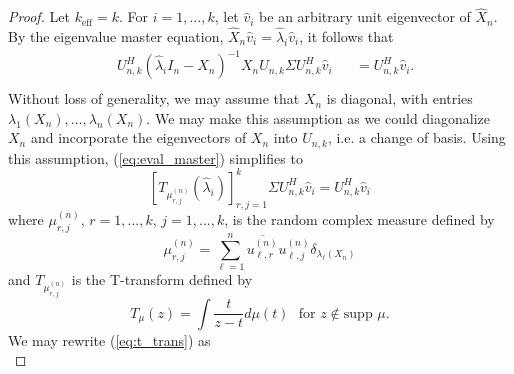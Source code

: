 \begin{proof}
Let $k_\text{eff}=k$. For $i=1,\dots, k$, let $\widehat{v}_i$ be an arbitrary unit eigenvector of $\widehat{X}_n$. By the eigenvalue master equation, $\widehat{X}_n\widehat{v}_i=\widehat{\lambda}_i\widehat{v}_i$, it follows that
\begin{equation}\label{eq:eval_master}
\begin{aligned}
&U_{n,k}^H\left(\widehat{\lambda}_iI_n-X_n\right)^{-1}X_nU_{n,k}\Sigma U_{n,k}^H\widehat{v}_i&&=U_{n,k}^H\widehat{v}_i.\\
\end{aligned}
\end{equation}
Without loss of generality, we may assume that $X_n$ is diagonal, with entries $\lambda_1\left(X_n\right),\dots,\lambda_n\left(X_n\right)$. We may make this assumption as we could diagonalize $X_n$ and incorporate the eigenvectors of $X_n$ into $U_{n,k}$, i.e. a change of basis. Using this assumption, (\ref{eq:eval_master}) simplifies to
\begin{equation}\label{eq:t_trans}
\left[T_{\mu_{r,j}^{\left(n\right)}}\left(\widehat{\lambda}_i\right)\right]_{r,j=1}^k \Sigma U_{n,k}^H\widehat{v}_i=U_{n,k}^H\widehat{v}_i
\end{equation}
where $\mu_{r,j}^{\left(n\right)}$, $r=1,\dots,k$, $j=1,\dots,k$, is the random complex measure defined by
\begin{equation*}
\mu_{r,j}^{\left(n\right)}=\sum_{\ell=1}^n\overline{u_{\ell,r}^{\left(n\right)}}u_{\ell,j}^{\left(n\right)}\delta_{\lambda_\ell\left(X_n\right)}
\end{equation*}
and $T_{\mu_{r,j}^{\left(n\right)}}$ is the T-transform defined by
\begin{equation*}
T_{\mu}\left(z\right) = \int\frac{t}{z-t}d\mu\left(t\right)\,\,\,\,\text{for } z\not\in\text{supp } \mu.
\end{equation*}
We may rewrite (\ref{eq:t_trans}) as
\begin{equation*}

\end{equation*}
\end{proof}
